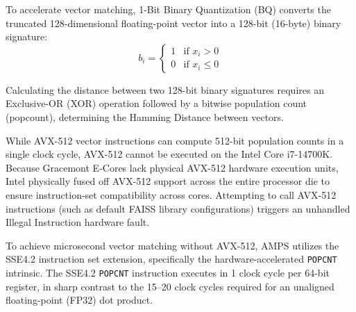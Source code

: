 To accelerate vector matching, 1-Bit Binary Quantization (BQ) converts the truncated 128-dimensional floating-point vector into a 128-bit (16-byte) binary signature:
\begin{equation}
    b_i = \begin{cases} 1 & \text{if } x_i > 0 \\ 0 & \text{if } x_i \le 0 \end{cases}
\end{equation}

Calculating the distance between two 128-bit binary signatures requires an Exclusive-OR (XOR) operation followed by a bitwise population count (popcount), determining the Hamming Distance between vectors.

While AVX-512 vector instructions can compute 512-bit population counts in a single clock cycle, AVX-512 cannot be executed on the Intel Core i7-14700K. Because Gracemont E-Cores lack physical AVX-512 hardware execution units, Intel physically fused off AVX-512 support across the entire processor die to ensure instruction-set compatibility across cores. Attempting to call AVX-512 instructions (such as default FAISS library configurations) triggers an unhandled Illegal Instruction hardware fault.

To achieve microsecond vector matching without AVX-512, AMPS utilizes the SSE4.2 instruction set extension, specifically the hardware-accelerated \texttt{POPCNT} intrinsic. The SSE4.2 \texttt{POPCNT} instruction executes in 1 clock cycle per 64-bit register, in sharp contrast to the 15--20 clock cycles required for an unaligned floating-point (FP32) dot product.

